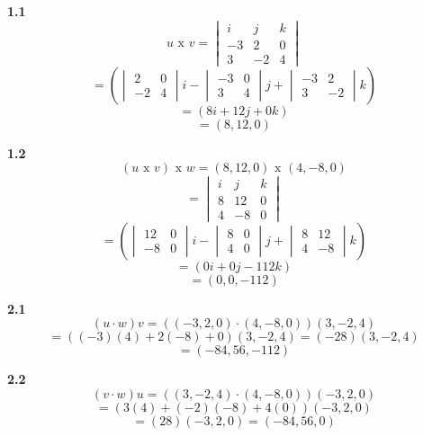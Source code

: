 \documentclass{article}
\begin{document}
\begin{minipage}[c]{0.5cm}
    \textbf{1.1}
    $$u \text{ x } v = \begin{vmatrix}
        i & j & k \\
        -3 & 2 & 0 \\
        3 & -2 & 4 
    \end{vmatrix}$$
    $$= \left(\begin{vmatrix}
        2 & 0 \\
        -2 & 4 
    \end{vmatrix}i - \begin{vmatrix}
        -3 & 0 \\
        3 & 4
    \end{vmatrix}j + \begin{vmatrix}
        -3 & 2 \\
        3 & -2
    \end{vmatrix}k\right)$$
    $$=(8i+12j+0k )$$
    $$=(8, 12, 0)$$
\end{minipage}\hspace*{6cm}\begin{minipage}[c]{0.5cm}
    \textbf{1.2}
    $$(u \text{ x } v)\text{ x }w = (8, 12, 0) \text{ x }(4,-8,0)$$
    $$=\begin{vmatrix}
        i & j & k \\
        8 & 12 & 0 \\
        4 & -8 & 0
    \end{vmatrix}$$
    $$= \left(\begin{vmatrix}
        12 & 0 \\
        -8 & 0
    \end{vmatrix}i - \begin{vmatrix}
        8 & 0 \\
        4 & 0 
    \end{vmatrix}j + \begin{vmatrix}
        8 & 12 \\
        4 & -8
    \end{vmatrix}k\right)$$
    $$= (0i + 0j -112k)$$
    $$= (0, 0, -112)$$
\end{minipage}
\vspace{10pt}

\hspace*{-3cm}\begin{minipage}[c]{0.5cm}
    \textbf{2.1}
    $$(u\cdot w)v = ((-3, 2, 0)\cdot (4,-8,0))(3,-2, 4)$$
    $$= ((-3)(4)+ 2(-8)+ 0)(3,-2, 4) = (-28)(3,-2,4)$$
    $$=(-84, 56, -112)$$
\end{minipage}\hspace*{8cm} \begin{minipage}[c]{0.5cm}
    \textbf{2.2}
    $$(v\cdot w)u= ((3,-2, 4)\cdot(4,-8,0))(-3, 2, 0)$$
    $$=(3(4)+(-2)(-8)+4(0))(-3, 2, 0)$$
    $$=(28)(-3, 2, 0) = (-84, 56 , 0)$$
\end{minipage}
\vspace{10pt}
\end{document}
